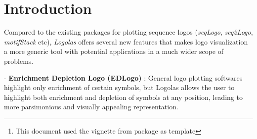 \documentclass[12pt]{article}\usepackage[]{graphicx}\usepackage[usenames,dvipsnames]{color}
\author{Kushal K Dey, Dongyue Xie, Matthew Stephens  \\[1em]
\small{Dept. of Statistics, The University of Chicago} \mbox{ }\\
\small{\texttt{$^*$Correspondending Email: kkdey@uchicago.edu}}}
\newcommand{\Logolas}{\textit{Logolas}}
\begin{document}
\maketitle

\begin{abstract}
\vspace{1em}
Sequence logo plots have become a standard graphical tool for visualizing sequence motifs in DNA, RNA or protein sequences. However standard logo plots primarily highlight enrichment of symbols, and may fail to highlight interesting depletions. Current alternatives that try to highlight depletion often produce visually cluttered logos. We introduce a new sequence logo plot, the EDLogo plot, that highlights both enrichment and depletion, while minimizing visual clutter. We provide an easy-to-use and highly customizable R package Logolas to produce a range of logo plots, including EDLogo plots. This software also allows elements in the logo plot to be strings of characters, rather than a single character, extending the range of applications beyond the usual DNA, RNA or protein sequences. We illustrate our methods and software on applications to transcription factor binding site motifs, protein sequence alignments and cancer mutation signature profiles. Our new EDLogo plots, and flexible software implementation, can help data analysts visualize both enrichment and depletion of characters (DNA sequence bases, amino acids, etc) across a wide range of applications.

\vspace{1em}
\textbf{\Logolas{} version:} 2.0.1 \footnote{This document used the vignette from \Bioconductor{} package  as  template}
\end{abstract}



\newpage

\tableofcontents

\section{Introduction}


Compared to the existing packages for plotting sequence logos (\textit{seqLogo}, \textit{seq2Logo}, \textit{motifStack} etc), \Logolas{} offers several new features that makes  logo visualization a more generic tool with potential applications in a much wider scope of problems.

- \textbf{Enrichment Depletion Logo (EDLogo)} : General logo plotting softwares highlight only enrichment of certain symbols, but Logolas allows the user to highlight both enrichment and depletion of symbols at any position, leading to more parsimonious and visually appealing representation.
\end{document}
